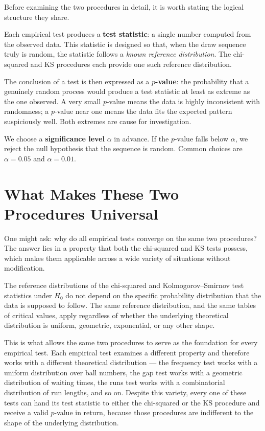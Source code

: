 Before examining the two procedures in detail, it is worth stating the
logical structure they share.
 
Each empirical test produces a \textbf{test statistic}: a single number
computed from the observed data.  This statistic is designed so that, when
the draw sequence truly is random, the statistic follows a \emph{known
reference distribution}.  The chi-squared and KS procedures each provide
one such reference distribution.
 
The conclusion of a test is then expressed as a \textbf{$p$-value}: the
probability that a genuinely random process would produce a test statistic
at least as extreme as the one observed.  A very small $p$-value means the
data is highly inconsistent with randomness; a $p$-value near one means the
data fits the expected pattern suspiciously well.  Both extremes are cause
for investigation.
 
We choose a \textbf{significance level} $\alpha$ in advance.  If the
$p$-value falls below $\alpha$, we reject the null hypothesis that the
sequence is random.  Common choices are $\alpha = 0.05$ and $\alpha = 0.01$.
 
\section{What Makes These Two Procedures Universal}
 
One might ask: why do all empirical tests converge on the same two
procedures?  The answer lies in a property that both the chi-squared and KS
tests possess, which makes them applicable across a wide variety of
situations without modification.
 
\begin{keyidea}
The reference distributions of the chi-squared and Kolmogorov--Smirnov test
statistics under $H_0$ do not depend on the specific probability
distribution that the data is supposed to follow.  The same reference
distribution, and the same tables of critical values, apply regardless of
whether the underlying theoretical distribution is uniform, geometric,
exponential, or any other shape.
\end{keyidea}
 
This is what allows the same two procedures to serve as the foundation for
every empirical test.  Each empirical test examines a different property and
therefore works with a different theoretical distribution --- the frequency
test works with a uniform distribution over ball numbers, the gap test works
with a geometric distribution of waiting times, the runs test works with a
combinatorial distribution of run lengths, and so on.  Despite this variety,
every one of these tests can hand its test statistic to either the
chi-squared or the KS procedure and receive a valid $p$-value in return,
because those procedures are indifferent to the shape of the underlying
distribution.
 
